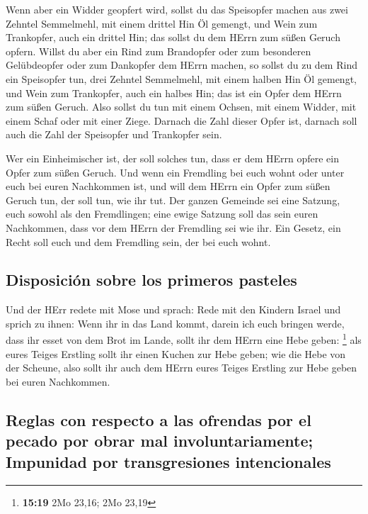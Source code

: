  Wenn aber ein Widder geopfert wird, sollst du das
Speisopfer machen aus zwei Zehntel Semmelmehl, mit einem drittel Hin Öl
gemengt,  und Wein zum Trankopfer, auch ein drittel Hin;
das sollst du dem HErrn zum süßen Geruch opfern.  Willst
du aber ein Rind zum Brandopfer oder zum besonderen Gelübdeopfer oder
zum Dankopfer dem HErrn machen,  so sollst du zu dem Rind
ein Speisopfer tun, drei Zehntel Semmelmehl, mit einem halben Hin Öl
gemengt,  und Wein zum Trankopfer, auch ein halbes Hin;
das ist ein Opfer dem HErrn zum süßen Geruch.  Also
sollst du tun mit einem Ochsen, mit einem Widder, mit einem Schaf oder
mit einer Ziege.  Darnach die Zahl dieser Opfer ist,
darnach soll auch die Zahl der Speisopfer und Trankopfer sein.

 Wer ein Einheimischer ist, der soll solches tun, dass er
dem HErrn opfere ein Opfer zum süßen Geruch.  Und wenn
ein Fremdling bei euch wohnt oder unter euch bei euren Nachkommen ist,
und will dem HErrn ein Opfer zum süßen Geruch tun, der soll tun, wie ihr
tut.  Der ganzen Gemeinde sei eine Satzung, euch sowohl
als den Fremdlingen; eine ewige Satzung soll das sein euren Nachkommen,
dass vor dem HErrn der Fremdling sei wie ihr.  Ein
Gesetz, ein Recht soll euch und dem Fremdling sein, der bei euch wohnt.

\hypertarget{disposiciuxf3n-sobre-los-primeros-pasteles}{%
\subsection{Disposición sobre los primeros
pasteles}\label{disposiciuxf3n-sobre-los-primeros-pasteles}}

 Und der HErr redete mit Mose und sprach: 
Rede mit den Kindern Israel und sprich zu ihnen: Wenn ihr in das Land
kommt, darein ich euch bringen werde,  dass ihr esset von
dem Brot im Lande, sollt ihr dem HErrn eine Hebe geben: \footnote{\textbf{15:19}
  2Mo 23,16; 2Mo 23,19}  als eures Teiges Erstling sollt
ihr einen Kuchen zur Hebe geben; wie die Hebe von der Scheune,
 also sollt ihr auch dem HErrn eures Teiges Erstling zur
Hebe geben bei euren Nachkommen.

\hypertarget{reglas-con-respecto-a-las-ofrendas-por-el-pecado-por-obrar-mal-involuntariamente-impunidad-por-transgresiones-intencionales}{%
\subsection{Reglas con respecto a las ofrendas por el pecado por obrar
mal involuntariamente; Impunidad por transgresiones
intencionales}\label{reglas-con-respecto-a-las-ofrendas-por-el-pecado-por-obrar-mal-involuntariamente-impunidad-por-transgresiones-intencionales}}

